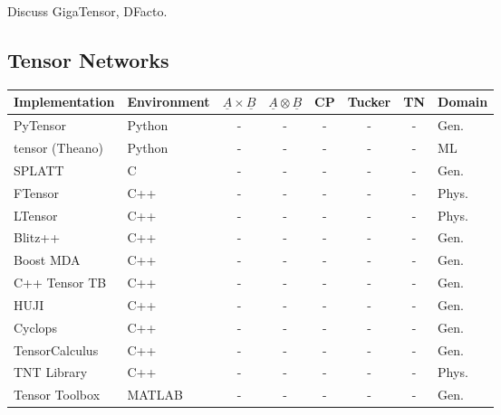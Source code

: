 \documentclass[10pt]{article}
\makeatletter
\newcommand{\ccell}[3][]{%
  \kern-\fboxsep
  \if\relax\detokenize{#1}\relax
    \expandafter\@firstoftwo
  \else
    \expandafter\@secondoftwo
  \fi
  {\colorbox{#2}}%
  {\colorbox[#1]{#2}}%
  {#3}\kern-\fboxsep
}
\newcommand{\yesy}{\ccell{green}{Y}}
\newcommand{\non}{\ccell{red}{N}}
\newcommand{\myhline}{}
\makeatother
\begin{document}
Discuss GigaTensor, DFacto.

\subsection{Tensor Networks}

\begin{center}\scriptsize
    \begin{tabular}{ |l  l  c  c  c  c  c  l|}
    \toprule
    \textbf{Implementation} & \textbf{Environment} & $\underline{A} \times \underline{B}$ & $\underline{A} \otimes \underline{B}$ & \textbf{CP} & \textbf{Tucker} & \textbf{TN} & \textbf{Domain} \\ \hline
    PyTensor~\cite{Yoo10pytensor:a}				
    & Python & \yesy & \non & \non & \yesy & \non & Gen. \\ \myhline
    tensor (Theano)             
    & Python & \yesy & \yesy & \non & \non & \non & ML \\ \myhline
    SPLATT~\cite{}
    & C & \yesy & \non & \non & \non & \non & Gen. \\ \myhline
    FTensor~\cite{Landry:2003:IHP:1240120.1240122,FTensor}					
    & C++ & \yesy & \yesy & \non & \non & \non & Phys. \\ \myhline
    LTensor~\cite{LTensor} 		
    & C++ & \yesy & \yesy & \non & \non & \non & Phys. \\ \myhline
    Blitz++~\cite{blitz} 
    & C++ & \yesy & \yesy & \non & \non & \non & Gen. \\ \myhline
    Boost MDA~\cite{boost-multiarray} 
    & C++ & \non & \non & \non & \non & \non & Gen. \\ \myhline
    C++ Tensor TB			
    & C++ & \yesy & \yesy & \yesy & \non & \non & Gen. \\ \myhline
    HUJI~\cite{huji} 		
    & C++ & \non & \non & \non & \non & \non & Gen. \\ \myhline
    Cyclops~\cite{CTF}
    & C++ & \yesy & \yesy & \non & \non & \non & Gen. \\ \myhline
    TensorCalculus~\cite{Calculus}
    & C++ & \yesy & \yesy & \yesy & \yesy & \yesy & Gen. \\ \myhline
    TNT Library~\cite{TNT}
    & C++ & \non ? & \yesy & \non & \non & \yesy & Phys. \\ \myhline
    Tensor Toolbox~\cite{TensorToolbox}
    & MATLAB & \yesy & \yesy & \yesy & \yesy & \non & Gen. \\ \myhline

\end{tabular}
\end{center}
\end{document}
